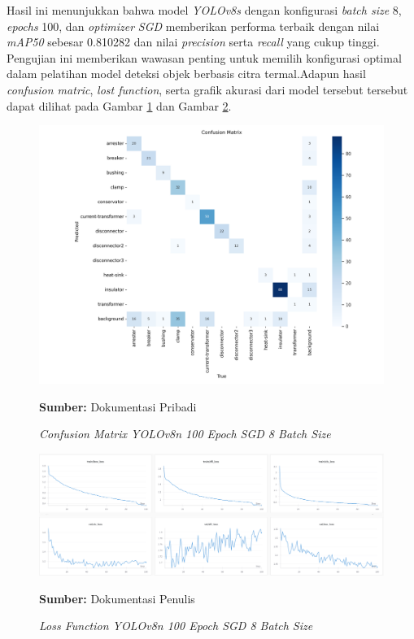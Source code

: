 Hasil ini menunjukkan bahwa model \emph{YOLOv8s} dengan konfigurasi \emph{batch
size} 8, \emph{epochs} 100, dan \emph{optimizer} \emph{SGD} memberikan performa
terbaik dengan nilai \emph{mAP50} sebesar 0.810282 dan nilai \emph{precision}
serta \emph{recall} yang cukup tinggi. Pengujian ini memberikan wawasan penting
untuk memilih konfigurasi optimal dalam pelatihan model deteksi objek berbasis
citra termal.Adapun hasil \emph{confusion matric}, \emph{lost function}, serta
grafik akurasi dari model tersebut tersebut dapat dilihat pada Gambar
\ref{fig:confusion_matrix} dan Gambar \ref{fig:loss_function}.
\begin{figure}[H]
	\centering
	\includegraphics[scale=0.15]{gambar/bab4/cf_res.png}
	\caption{\emph{Confusion Matrix YOLOv8n 100 Epoch SGD 8 Batch Size}}
	\footnotesize{\textbf{Sumber:} Dokumentasi Pribadi}
	\label{fig:confusion_matrix}
\end{figure}

\begin{figure}[H]
	\centering
	\includegraphics[scale=0.3]{gambar/bab4/lost_function.png}
	\caption{\emph{Loss Function YOLOv8n 100 Epoch SGD 8 Batch Size}}
	\label{fig:loss_function} \footnotesize{\textbf{Sumber:} Dokumentasi Penulis}
\end{figure}


